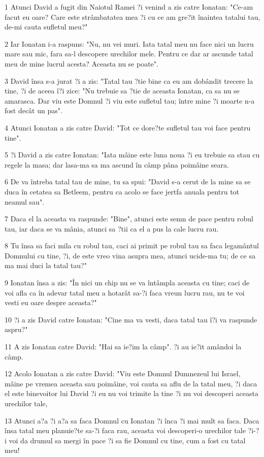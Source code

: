 \par 1 Atunci David a fugit din Naiotul Ramei ?i venind a zis catre Ionatan: "Ce-am facut eu oare? Care este strâmbatatea mea ?i cu ce am gre?it înaintea tatalui tau, de-mi cauta sufletul meu?"
\par 2 Iar Ionatan i-a raspuns: "Nu, nu vei muri. Iata tatal meu nu face nici un lucru mare sau mic, fara sa-l descopere urechilor mele. Pentru ce dar ar ascunde tatal meu de mine lucrul acesta? Aceasta nu se poate".
\par 3 David însa s-a jurat ?i a zis: "Tatal tau ?tie bine ca eu am dobândit trecere la tine, ?i de aceea î?i zice: "Nu trebuie sa ?tie de aceasta Ionatan, ca sa nu se amarasca. Dar viu este Domnul ?i viu este sufletul tau; între mine ?i moarte n-a fost decât un pas".
\par 4 Atunci Ionatan a zis catre David: "Tot ce dore?te sufletul tau voi face pentru tine".
\par 5 ?i David a zis catre Ionatan: "Iata mâine este luna noua ?i eu trebuie sa stau cu regele la masa; dar lasa-ma sa ma ascund în câmp pâna poimâine seara.
\par 6 De va întreba tatal tau de mine, tu sa spui: "David s-a cerut de la mine sa se duca în cetatea sa Betleem, pentru ca acolo se face jertfa anuala pentru tot neamul sau".
\par 7 Daca el la aceasta va raspunde: "Bine", atunci este semn de pace pentru robul tau, iar daca se va mânia, atunci sa ?tii ca el a pus la cale lucru rau.
\par 8 Tu însa sa faci mila cu robul tau, caci ai primit pe robul tau sa faca legamântul Domnului cu tine, ?i, de este vreo vina asupra mea, atunci ucide-ma tu; de ce sa ma mai duci la tatal tau?"
\par 9 Ionatan însa a zis: "În nici un chip nu se va întâmpla aceasta cu tine; caci de voi afla ca în adevar tatal meu a hotarât sa-?i faca vreun lucru rau, nu te voi vesti eu oare despre aceasta?"
\par 10 ?i a zis David catre Ionatan: "Cine ma va vesti, daca tatal tau î?i va raspunde aspru?"
\par 11 A zis Ionatan catre David: "Hai sa ie?im la câmp". ?i au ie?it amândoi la câmp.
\par 12 Acolo Ionatan a zis catre David: "Viu este Domnul Dumnezeul lui Israel, mâine pe vremea aceasta sau poimâine, voi cauta sa aflu de la tatal meu, ?i daca el este binevoitor lui David ?i eu nu voi trimite la tine ?i nu voi descoperi aceasta urechilor tale,
\par 13 Atunci a?a ?i a?a sa faca Domnul cu Ionatan ?i înca ?i mai mult sa faca. Daca însa tatal meu planuie?te sa-?i faca rau, aceasta voi descoperi-o urechilor tale ?i-?i voi da drumul sa mergi în pace ?i sa fie Domnul cu tine, cum a fost cu tatal meu!
